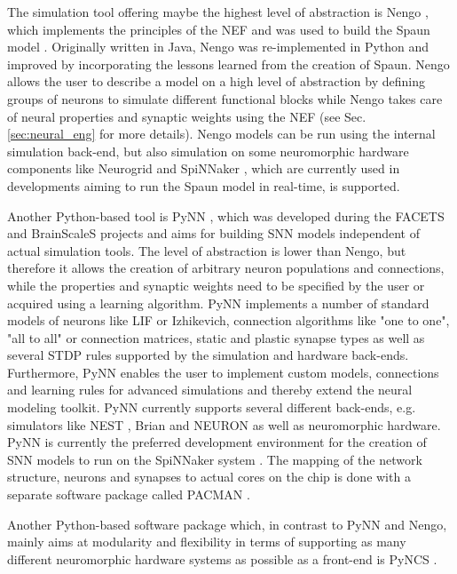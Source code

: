 The simulation tool offering maybe the highest level of abstraction is \ac{Nengo} \cite{Stewart2009}, which implements the principles of the \ac{NEF} \cite{Eliasmith2003} and was used to build the \ac{Spaun} model \cite{Eliasmith2012}.
Originally written in Java, \ac{Nengo} was re-implemented in Python \cite{Bekolay2014} and improved by incorporating the lessons learned from the creation of \ac{Spaun}.
\ac{Nengo} allows the user to describe a model on a high level of abstraction by defining groups of neurons to simulate different functional blocks while \ac{Nengo} takes care of neural properties and synaptic weights using the \ac{NEF} (see Sec. \ref{sec:neural_eng} for more details).
\ac{Nengo} models can be run using the internal simulation back-end, but also simulation on some neuromorphic hardware components like Neurogrid \cite{Dethier2011, Choudhary2012} and \ac{SpiNNaker} \cite{Mundy2015}, which are currently used in developments aiming to run the \ac{Spaun} model in real-time, is supported.

Another Python-based tool is \ac{PyNN} \cite{Davies2010}, which was developed during the \ac{FACETS} \cite{FACETS-proj} and \ac{BrainScaleS} \cite{BrainScaleS-proj} projects and aims for building \ac{SNN} models independent of actual simulation tools.
The level of abstraction is lower than \ac{Nengo}, but therefore it allows the creation of arbitrary neuron populations and connections, while the properties and synaptic weights need to be specified by the user or acquired using a learning algorithm.
\ac{PyNN} implements a number of standard models of neurons like \ac{LIF} or Izhikevich, connection algorithms like "one to one", "all to all" or connection matrices, static and plastic synapse types as well as several \ac{STDP} rules supported by the simulation and hardware back-ends.
Furthermore, \ac{PyNN} enables the user to implement custom models, connections and learning rules for advanced simulations and thereby extend the neural modeling toolkit.
\ac{PyNN} currently supports several different back-ends, e.g. simulators like \ac{NEST} \cite{Gewaltig2007}, Brian \cite{Goodman2009} and NEURON  \cite{Carnevale2009} as well as neuromorphic hardware.
\ac{PyNN} is currently the preferred development environment for the creation of \ac{SNN} models to run on the \ac{SpiNNaker} system \cite{Furber2014}.
The mapping of the network structure, neurons and synapses to actual cores on the chip is done with a separate software package called \ac{PACMAN} \cite{Galluppi2012}.

Another Python-based software package which, in contrast to \ac{PyNN} and \ac{Nengo}, mainly aims at modularity and flexibility in terms of supporting as many different neuromorphic hardware systems as possible as a front-end is \ac{PyNCS} \cite{Stefanini2014}.

